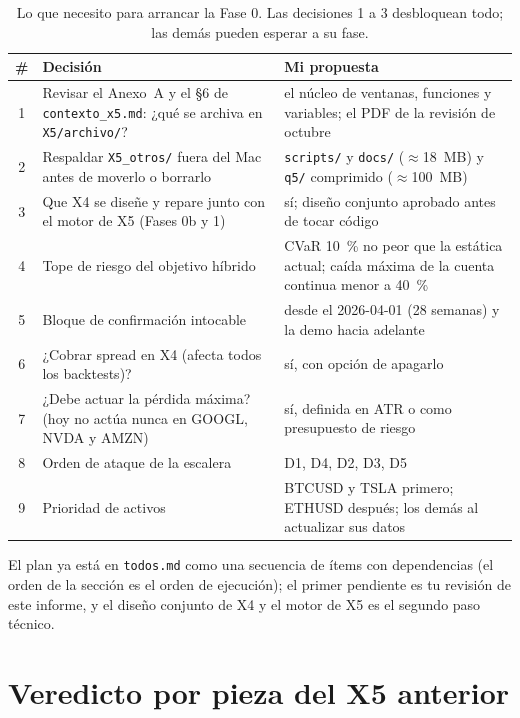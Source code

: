 \documentclass[11pt,a4paper]{article}
\newcommand{\code}[1]{\texttt{\small #1}}
\begin{document}
\begin{table}[H]
\centering\small
\begin{tabularx}{\linewidth}{cXX}
\toprule
\# & Decisión & Mi propuesta \\
\midrule
1 & Revisar el Anexo~A y el \S6 de \code{contexto\_x5.md}: ¿qué se archiva en \code{X5/archivo/}? & el núcleo de ventanas, funciones y variables; el PDF de la revisión de octubre \\
2 & Respaldar \code{X5\_otros/} fuera del Mac antes de moverlo o borrarlo & \code{scripts/} y \code{docs/} ($\approx$18~MB) y \code{q5/} comprimido ($\approx$100~MB) \\
3 & Que X4 se diseñe y repare junto con el motor de X5 (Fases 0b y 1) & sí; diseño conjunto aprobado antes de tocar código \\
4 & Tope de riesgo del objetivo híbrido & CVaR 10~\% no peor que la estática actual; caída máxima de la cuenta continua menor a 40~\% \\
5 & Bloque de confirmación intocable & desde el 2026-04-01 (28 semanas) y la demo hacia adelante \\
6 & ¿Cobrar spread en X4 (afecta todos los backtests)? & sí, con opción de apagarlo \\
7 & ¿Debe actuar la pérdida máxima? (hoy no actúa nunca en GOOGL, NVDA y AMZN) & sí, definida en ATR o como presupuesto de riesgo \\
8 & Orden de ataque de la escalera & D1, D4, D2, D3, D5 \\
9 & Prioridad de activos & BTCUSD y TSLA primero; ETHUSD después; los demás al actualizar sus datos \\
\bottomrule
\end{tabularx}
\caption{Lo que necesito para arrancar la Fase 0. Las decisiones 1 a 3 desbloquean todo; las demás pueden esperar a su fase.}
\end{table}

El plan ya está en \code{todos.md} como una secuencia de ítems con dependencias (el orden de la sección es el orden de ejecución);
el primer pendiente es tu revisión de este informe, y el diseño conjunto de X4 y el motor de X5 es el segundo paso técnico.

\appendix
\section{Veredicto por pieza del X5 anterior}
\end{document}
